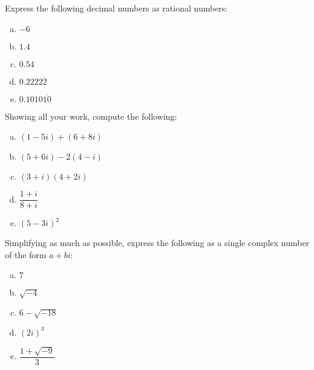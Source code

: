 \documentclass[11pt,letterpaper]{article}
\begin{document}
\newpage



 Express the following decimal numbers as rational numbers:
\begin{enumerate}[(a)]
\item $-6$
\item $1.4$
\item $0.54$
\item $0.2222\overline{2}$
\item $0.1010\overline{10}$
\end{enumerate}



\newpage



 Showing all your work, compute the following:
\begin{enumerate}[(a)]
\item $(1 - 5i) + (6 + 8i)$
\item $(5 + 6i) - 2(4 - i)$
\item $(3 + i)(4 + 2i)$
\item $\dfrac{1 + i}{8 + i}$
\item $(5 - 3i)^2$
\end{enumerate}



\newpage



 Simplifying as much as possible, express the following as a single complex number of the form $a + bi$:
\begin{enumerate}[(a)]
\item $7$
\item $\sqrt{-4}$
\item $6 - \sqrt{-18}$
\item $(2i)^3$
\item $\dfrac{1 + \sqrt{-9}}{3}$
\end{enumerate}
\end{document}
